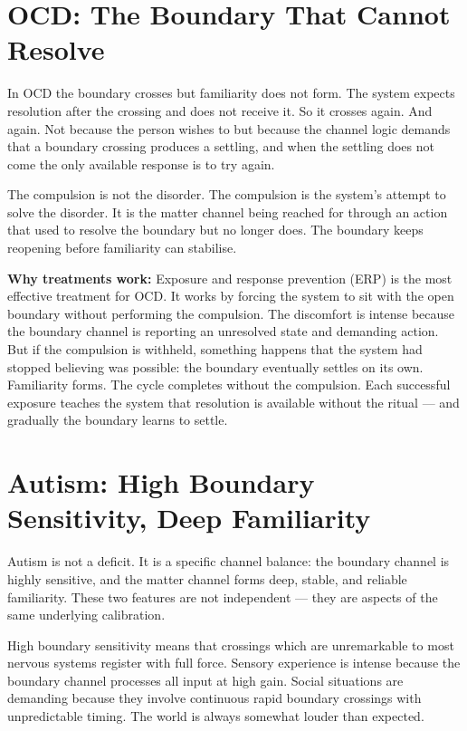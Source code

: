 \documentclass[12pt]{article}
\begin{document}
\section{OCD: The Boundary That Cannot Resolve}

In OCD the boundary crosses but familiarity does not form. The system expects
resolution after the crossing and does not receive it. So it crosses again. And
again. Not because the person wishes to but because the channel logic demands
that a boundary crossing produces a settling, and when the settling does not
come the only available response is to try again.

The compulsion is not the disorder. The compulsion is the system's attempt to
solve the disorder. It is the matter channel being reached for through an action
that used to resolve the boundary but no longer does. The boundary keeps
reopening before familiarity can stabilise.

\textbf{Why treatments work:}
Exposure and response prevention (ERP) is the most effective treatment for OCD.
It works by forcing the system to sit with the open boundary without performing
the compulsion. The discomfort is intense because the boundary channel is
reporting an unresolved state and demanding action. But if the compulsion is
withheld, something happens that the system had stopped believing was possible:
the boundary eventually settles on its own. Familiarity forms. The cycle
completes without the compulsion. Each successful exposure teaches the system
that resolution is available without the ritual --- and gradually the boundary
learns to settle.

\section{Autism: High Boundary Sensitivity, Deep Familiarity}

Autism is not a deficit. It is a specific channel balance: the boundary channel
is highly sensitive, and the matter channel forms deep, stable, and reliable
familiarity. These two features are not independent --- they are aspects of the
same underlying calibration.

High boundary sensitivity means that crossings which are unremarkable to most
nervous systems register with full force. Sensory experience is intense because
the boundary channel processes all input at high gain. Social situations are
demanding because they involve continuous rapid boundary crossings with
unpredictable timing. The world is always somewhat louder than expected.
\end{document}
